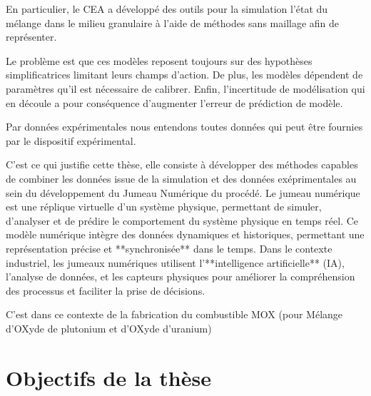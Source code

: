 En particulier, le CEA a développé des outils pour la simulation l'état du mélange dans le milieu granulaire à l'aide de méthodes sans maillage afin de représenter.

Le problème est que ces modèles reposent toujours sur des hypothèses simplificatrices limitant leurs champs d'action. De plus, les modèles dépendent de paramètres qu'il est nécessaire de calibrer. Enfin, l'incertitude de modélisation qui en découle a pour conséquence d'augmenter l'erreur de prédiction de modèle.

Par données expérimentales nous entendons toutes données qui peut être fournies par le dispositif expérimental.

C'est ce qui justifie cette thèse, elle consiste à développer des méthodes capables de combiner les données issue de la simulation et des données exéprimentales au sein du développement du Jumeau Numérique du procédé. Le jumeau numérique est une réplique virtuelle d'un système physique, permettant de simuler, d'analyser et de prédire le comportement du système physique en temps réel. Ce modèle numérique intègre des données dynamiques et historiques, permettant une représentation précise et **synchronisée** dans le temps. Dans le contexte industriel, les jumeaux numériques utilisent l'**intelligence artificielle** (IA), l'analyse de données, et les capteurs physiques pour améliorer la compréhension des processus et faciliter la prise de décisions.


C'est dans ce contexte de la fabrication du combustible MOX (pour Mélange d’OXyde de plutonium et d’OXyde d’uranium)


\section*{Objectifs de la thèse}
